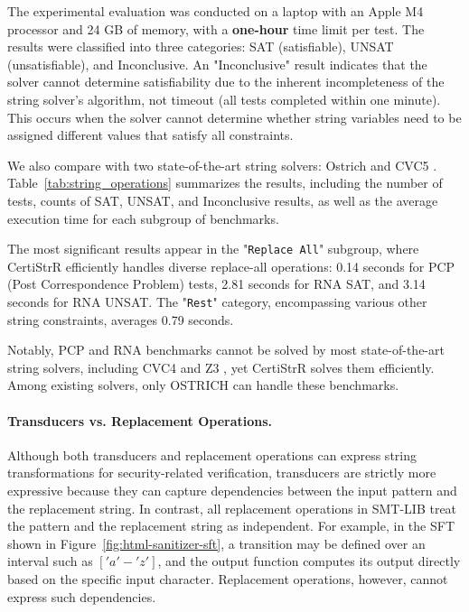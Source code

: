 The experimental evaluation was conducted on a laptop with an Apple M4 processor and 24 GB of memory, with a \textbf{one-hour} time limit per test. The results were classified into three categories: SAT (satisfiable), UNSAT (unsatisfiable), and Inconclusive. An "Inconclusive" result indicates that the solver cannot determine satisfiability due to the inherent incompleteness of the string solver's algorithm, not timeout (all tests completed within one minute). This occurs when the solver cannot determine whether string variables need to be assigned different values that satisfy all constraints.

We also compare with two state-of-the-art string solvers: Ostrich \cite{pacmpl/ChenFHHHKLRW22} and CVC5 \cite{cvc5}. Table~\ref{tab:string_operations} summarizes the results, including the number of tests, counts of SAT, UNSAT, and Inconclusive results, as well as the average execution time for each subgroup of benchmarks.




The most significant results appear in the "\texttt{Replace All}" subgroup, where CertiStrR efficiently handles diverse replace-all operations: 0.14 seconds for PCP (Post Correspondence Problem) tests, 2.81 seconds for RNA SAT, and 3.14 seconds for RNA UNSAT. The "\texttt{Rest}" category, encompassing various other string constraints, averages 0.79 seconds.

Notably, PCP and RNA benchmarks cannot be solved by most state-of-the-art string
solvers, including CVC4 \cite{cvc4} and Z3 \cite{Z3-str3}, yet CertiStrR solves
them efficiently. Among existing solvers, only OSTRICH \cite{pacmpl/ChenFHHHKLRW22} can handle these benchmarks.


\paragraph{Transducers vs. Replacement Operations.}  
Although both transducers and replacement operations can express string transformations for security-related verification, transducers are strictly more expressive because they can capture dependencies between the input pattern and the replacement string. In contrast, all replacement operations in SMT-LIB treat the pattern and the replacement string as independent. For example, in the SFT shown in Figure~\ref{fig:html-sanitizer-sft}, a transition may be defined over an interval such as $['a'-'z']$, and the output function computes its output directly based on the specific input character. Replacement operations, however, cannot express such dependencies.  

